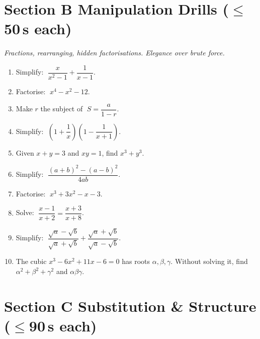\documentclass[11pt,a4paper]{article}
\begin{document}
\section*{Section B \quad Manipulation Drills \hfill{\normalfont\small($\leq$50\,s each)}}

\noindent\textit{Fractions, rearranging, hidden factorisations. Elegance over brute force.}

\begin{enumerate}

\item Simplify: $\;\dfrac{x}{x^2-1}+\dfrac{1}{x-1}$.

\item Factorise: $\;x^4 - x^2 - 12$.

\item Make $r$ the subject of $\;S = \dfrac{a}{1-r}$.

\item Simplify: $\;\left(1+\dfrac{1}{x}\right)\!\left(1-\dfrac{1}{x+1}\right)$.

\item Given $x+y=3$ and $xy=1$, find $x^3+y^3$.

\item Simplify: $\;\dfrac{(a+b)^2-(a-b)^2}{4ab}$.

\item Factorise: $\;x^3+3x^2-x-3$.

\item Solve: $\;\dfrac{x-1}{x+2}=\dfrac{x+3}{x+8}$.

\item Simplify: $\;\dfrac{\sqrt{a}-\sqrt{b}}{\sqrt{a}+\sqrt{b}}+\dfrac{\sqrt{a}+\sqrt{b}}{\sqrt{a}-\sqrt{b}}$.

\item The cubic $x^3 - 6x^2 + 11x - 6 = 0$ has roots $\alpha, \beta, \gamma$.
      Without solving it, find $\alpha^2+\beta^2+\gamma^2$ and $\alpha\beta\gamma$.

\end{enumerate}

\section*{Section C \quad Substitution \& Structure \hfill{\normalfont\small($\leq$90\,s each)}}
\end{document}
